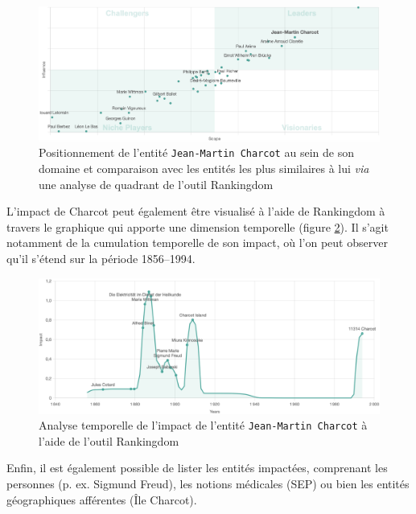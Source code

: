 \begin{figure}[htpb]
	\centering
	\includegraphics[width=1\textwidth]{img/analyse_quadrant.png}
	\caption[Positionnement de l'entité \texttt{Jean-Martin Charcot} au sein de son domaine et comparaison avec les entités les plus similaires à lui \textit{via} une analyse de quadrant de l'outil Rankingdom.]{Positionnement de l'entité \texttt{Jean-Martin Charcot} au sein de son domaine et comparaison avec les entités les plus similaires à lui \textit{via} une analyse de quadrant de l'outil Rankingdom\protect{}}
	\label{fig:analyse_quadrant}
\end{figure}


\bigskip
L'impact de Charcot peut également être visualisé à l'aide de Rankingdom à travers le graphique qui apporte une dimension temporelle (figure \ref{fig:impact_temporel}). Il s'agit notamment de la cumulation temporelle de son impact, où l'on peut observer qu'il s'étend sur la période 1856--1994. 

\begin{figure}[h]
	\centering
	\includegraphics[width=1\textwidth]{img/impact_temporel.png}
	\caption[Analyse temporelle de l'impact de l'entité \texttt{Jean-Martin Charcot} à l'aide de l'outil Rankingdom.]{Analyse temporelle de l'impact de l'entité \texttt{Jean-Martin Charcot} à l'aide de l'outil Rankingdom\protect{}}
	\label{fig:impact_temporel}
\end{figure}


Enfin, il est également possible de lister les entités impactées, comprenant les personnes (p. ex. Sigmund Freud), les notions médicales (SEP) ou bien les entités géographiques afférentes (Île Charcot).
